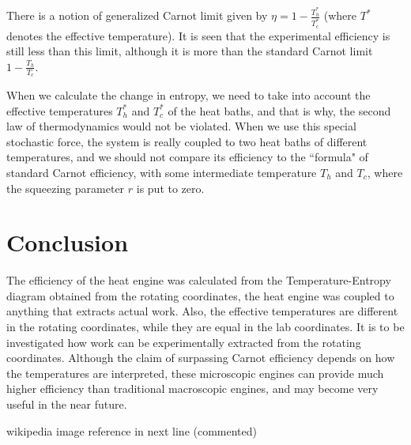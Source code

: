 \documentclass[12pt, twoside]{article}
\begin{document}
There is a notion of generalized Carnot limit given by $\eta = 1 - \frac{T^*_{h}}{T^*_{c}}$ (where $T^*$ denotes the effective temperature). It is seen that the experimental efficiency is still less than this limit, although it is more than the standard Carnot limit $1 - \frac{T_{h}}{T_{c}}$. 

When we calculate the change in entropy, we need to take into account the effective temperatures  ${T^*_{h}}$ and ${T^*_{c}}$ of the heat baths, and that is why, the second law of thermodynamics would not be violated. When we use this special stochastic force, the system is really coupled to two heat baths of different temperatures, and we should not compare its efficiency to the ``formula" of standard Carnot efficiency, with some intermediate temperature $T_{h}$ and $T_{c}$, where the squeezing parameter $r$ is put to zero.

\section{Conclusion}
The efficiency of the heat engine was calculated from the Temperature-Entropy diagram obtained from the rotating coordinates, the heat engine was coupled to anything that extracts actual work. Also, the effective temperatures are different in the rotating coordinates, while they are equal in the lab coordinates. It is to be investigated how work can be experimentally extracted from the rotating coordinates. Although the claim of surpassing Carnot efficiency depends on how the temperatures are interpreted, these microscopic engines can provide much higher efficiency than traditional macroscopic engines, and may become very useful in the near future.




wikipedia image reference in next line (commented)
\end{document}
